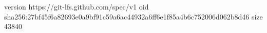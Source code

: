 version https://git-lfs.github.com/spec/v1
oid sha256:27bf45f6a82693e0a9bf91c59a6ac44932a6ff6e1f85a4b6c752006d062b8d46
size 43840
